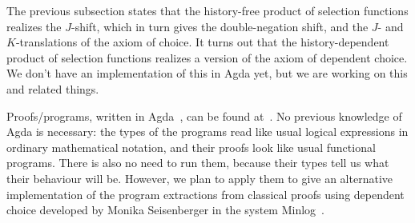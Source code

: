 
The previous subsection states that the history-free product of
selection functions realizes the $J$-shift, which in turn gives the
double-negation shift, and the $J$- and $K$-translations of the axiom
of choice. It turns out that the history-dependent product of
selection functions realizes a version of the axiom of dependent
choice. We don't have an implementation of this in Agda yet, but we
are working on this and related things.


Proofs/programs, written in Agda~\cite{bove:dybjer}, can be found
at~\cite{EO(2010):mfps:programs}. No previous knowledge of Agda is
necessary: the types of the programs read like usual logical
expressions in ordinary mathematical notation, and their proofs look
like usual functional programs.  There is also no need to run them,
because their types tell us what their behaviour will be. However, we
plan to apply them to give an alternative implementation of the
program extractions from classical proofs using dependent choice
developed by Monika Seisenberger in the system
Minlog~\cite{Seisenberger(2008)}.



